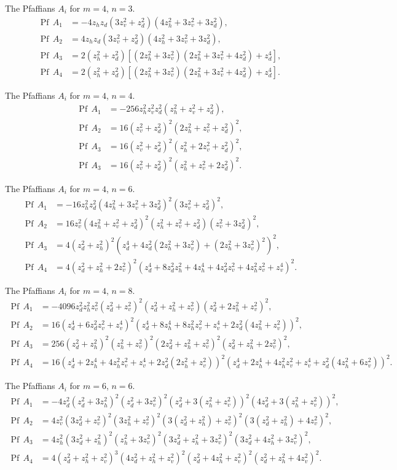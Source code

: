\documentclass[12pt,reqno]{amsart}
\numberwithin{equation}{section}
\newcommand{\Pf}{{\operatorname{Pf}\,}}
\begin{document}
\begin{appendix}
 The Pfaffians $A_i$ for $m=4$, $n=3$.
\[
\begin{aligned}
\Pf A_1&=-4z_hz_d(3z_v^2+z_d^2)(4z_h^2+3z_v^2+3z_d^2),\\
\Pf A_2&=4z_hz_d(3z_v^2+z_d^2)(4z_h^2+3z_v^2+3z_d^2),\\
\Pf A_3&=2(z_h^2+z_d^2)[(2z_h^2+3z_v^2)(2z_h^2+3z_v^2+4z_d^2)+z_d^4],\\
\Pf A_4&=2(z_h^2+z_d^2)[(2z_h^2+3z_v^2)(2z_h^2+3z_v^2+4z_d^2)+z_d^4].
\end{aligned}
\]


 The Pfaffians $A_i$ for $m=4$, $n=4$.
\[
\begin{aligned}
\Pf A_1&=-256z_h^2z_v^2z_d^2(z_h^2+z_v^2+z_d^2),\\
\Pf A_2&=16(z_v^2+z_d^2)^2(2z_h^2+z_v^2+z_d^2)^2,\\
\Pf A_3&=16(z_v^2+z_d^2)^2(z_h^2+2z_v^2+z_d^2)^2,\\
\Pf A_3&=16(z_v^2+z_d^2)^2(z_h^2+z_v^2+2z_d^2)^2.
\end{aligned}
\]


 The Pfaffians $A_i$ for $m=4$, $n=6$.
\[
\begin{aligned}
\Pf A_1&=-16z_h^2z_d^2(4z_h^2+3z_v^2+3z_d^2)^2(3z_v^2+z_d^2)^2,\\
\Pf A_2&=16z_v^2(4z_h^2+z_v^2+z_d^2)^2(z_h^2+z_v^2+z_d^2)(z_v^2+3z_d^2)^2,\\
\Pf A_3&=4(z_d^2 + z_h^2)^2(z_d^4 + 4z_d^2 (2z_h^2 + 3z_v^2) + (2z_h^2 + 3z_v^2)^2)^2,\\
\Pf A_4&=4(z_d^2 + z_h^2 + 2z_v^2)^2(z_d^4 + 8z_d^2z_h^2 + 4z_h^4 + 4z_d^2z_v^2 + 
   4z_h^2z_v^2 + z_v^4)^2.
\end{aligned}
\]


 The Pfaffians $A_i$ for $m=4$, $n=8$.
\[
\begin{aligned}
\Pf A_1&=-4096z_d^2z_h^2z_v^2(z_d^2 + z_v^2)^2(z_d^2 + z_h^2 + z_v^2)(z_d^2 + 2z_h^2 + z_v^2)^2,\\
\Pf A_2&=16(z_d^4 + 6z_d^2z_v^2 + z_v^4)^2(z_d^4 + 8z_h^4 + 8z_h^2 z_v^2 + z_v^4 + 
   2z_d^2 (4z_h^2 + z_v^2))^2,\\
\Pf A_3&=256(z_d^2 + z_h^2)^2(z_h^2 + z_v^2)^2(2z_d^2 + z_h^2 + z_v^2)^2(z_d^2 + z_h^2 + 
   2z_v^2)^2,\\
\Pf A_4&=16(z_d^4 + 2z_h^4 + 4z_h^2z_v^2 + z_v^4 + 2z_d^2(2z_h^2 + z_v^2))^2(z_d^4 + 
   2z_h^4 + 4z_h^2z_v^2 + z_v^4 + z_d^2 (4z_h^2 + 6z_v^2))^2.
\end{aligned}
\]


 The Pfaffians $A_i$ for $m=6$, $n=6$.
\[
\begin{aligned}
\Pf A_1&=-4z_d^2(z_d^2 + 3z_h^2)^2(z_d^2 + 3z_v^2)^2 (z_d^2 + 
   3 (z_h^2 + z_v^2))^2 (4z_d^2 + 3 (z_h^2 + z_v^2))^2,\\
\Pf A_2&=4 z_v^2 (3 z_d^2 + z_v^2)^2 (3 z_h^2 + z_v^2)^2 (3 (z_d^2 + z_h^2) + 
   z_v^2)^2 (3 (z_d^2 + z_h^2) + 4 z_v^2)^2,\\
\Pf A_3&=4 z_h^2 (3 z_d^2 + z_h^2)^2 (z_h^2 + 3 z_v^2)^2 (3 z_d^2 + z_h^2 + 
   3 z_v^2)^2 (3 z_d^2 + 4 z_h^2 + 3 z_v^2)^2,\\
\Pf A_4&=4 (z_d^2 + z_h^2 + z_v^2)^3 (4 z_d^2 + z_h^2 + z_v^2)^2 (z_d^2 + 4 z_h^2 + 
   z_v^2)^2 (z_d^2 + z_h^2 + 4 z_v^2)^2.
\end{aligned}
\]



\end{appendix}
\end{document}
